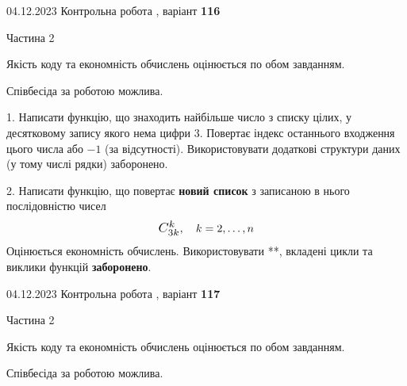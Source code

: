 \documentclass[12pt, ukrainian]{article}
\begin{document}
{{{{{{{{{{{{{{{%



\begin {Huge}
{{04.12.2023 Контрольна робота , варіант  \No \textbf { 116 }\par}}

\begin{center}Частина 2
\end{center}
\vspace{10mm}
\end {Huge}

{
\begin {Large}
Якість коду та економність обчислень оцінюється по обом завданням.

Співбесіда за роботою можлива.

\vspace{5mm}

1. Написати функцію, що знаходить найбільше число з списку цілих, у десятковому запису якого нема цифри 3. Повертає індекс останнього входження цього числа або $-1$ (за відсутності). Використовувати додаткові структури даних (у тому числі рядки) заборонено.

\vspace{10mm}



2. 
Написати функцію, що повертає \textbf{новий список} з записаною в нього послідовністю чисел
$$\scalebox{1.2}{$C_{3k}^{k}$}, \quad k=2,\ldots,n$$
Оцінюється економність обчислень. Використовувати **, вкладені цикли та виклики функцій \textbf{заборонено}.

\end{Large}\newpage




\begin {Huge}
{{04.12.2023 Контрольна робота , варіант  \No \textbf { 117 }\par}}

\begin{center}Частина 2
\end{center}
\vspace{10mm}
\end {Huge}

{
\begin {Large}
Якість коду та економність обчислень оцінюється по обом завданням.

Співбесіда за роботою можлива.

\vspace{5mm}


\end{Large}}}}}}}}}}}}}}}}}}
\end{document}
